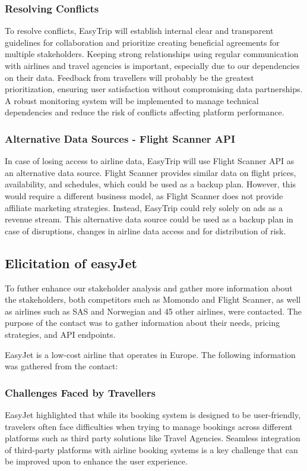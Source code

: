 \subsubsection{Resolving Conflicts}
To resolve conflicts, EasyTrip will establish internal clear and transparent guidelines for collaboration and prioritize creating beneficial agreements for multiple stakeholders. Keeping strong relationships using regular communication with airlines and travel agencies is important, especially due to our dependencies on their data. Feedback from travellers will probably be the greatest prioritization, ensuring user satisfaction without compromising data partnerships. A robust monitoring system will be implemented to manage technical dependencies and reduce the risk of conflicts affecting platform performance.

\subsubsection{Alternative Data Sources - Flight Scanner API}
In case of losing access to airline data, EasyTrip will use Flight Scanner API as an alternative data source. Flight Scanner provides similar data on flight prices, availability, and schedules, which could be used as a backup plan. However, this would require a different business model, as Flight Scanner does not provide affiliate marketing strategies. Instead, EasyTrip could rely solely on ads as a revenue stream. This alternative data source could be used as a backup plan in case of disruptions, changes in airline data access and for distribution of risk.
\subsection{Elicitation of easyJet}
To futher enhance our stakeholder analysis and gather more information about the stakeholders, both competitors such as Momondo and Flight Scanner, as well as airlines such as SAS and Norwegian and 45 other airlines, were contacted. The purpose of the contact was to gather information about their needs, pricing strategies, and API endpoints. 

EasyJet is a low-cost airline that operates in Europe. The following information was gathered from the contact:
\subsubsection{Challenges Faced by Travellers}
EasyJet highlighted that while its booking system is designed to be user-friendly, travelers often face difficulties when trying to manage bookings across different platforms such as third party solutions like Travel Agencies. Seamless integration of third-party platforms with airline booking systems is a key challenge that can be improved upon to enhance the user experience.

